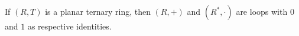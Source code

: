 If $(R, T)$ is a planar ternary ring, then $(R, +)$ and $(R^*, \cdot)$ are loops with $0$ and $1$ as respective identities.
